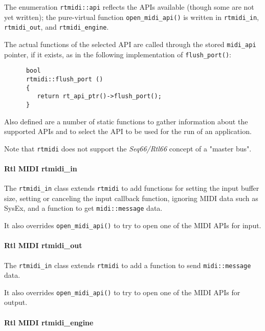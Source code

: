    The enumeration \texttt{rtmidi::api} reflects the APIs available
   (though some are not yet written); the pure-virtual function
   \texttt{open\_midi\_api()} is written in
   \texttt{rtmidi\_in}, \texttt{rtmidi\_out}, and \texttt{rtmidi\_engine}.

   The actual functions of the selected API are called through the stored
   \texttt{midi\_api} pointer, if it exists, as in the following
   implementation of \texttt{flush\_port()}:

   \begin{verbatim}
      bool
      rtmidi::flush_port ()
      {
         return rt_api_ptr()->flush_port();
      }
   \end{verbatim}

   Also defined are a number of static functions to gather information
   about the supported APIs and to select the API to be used for the
   run of an application.

   Note that \texttt{rtmidi} does not support the \textsl{Seq66/Rtl66}
   concept of a "master bus".

\paragraph{Rtl MIDI rtmidi\_in}
\label{paragraph:rtl_midi_rtmidi_in}

   The \texttt{rtmidi\_in} class extends \texttt{rtmidi} to
   add functions for setting the input buffer size, setting or canceling
   the input callback function, ignoring MIDI data such as SysEx,
   and a function to get \texttt{midi::message} data.

   It also overrides \texttt{open\_midi\_api()} to try to open
   one of the MIDI APIs for input.

\paragraph{Rtl MIDI rtmidi\_out}
\label{paragraph:rtl_midi_rtmidi_out}

   The \texttt{rtmidi\_in} class extends \texttt{rtmidi} to
   add a function to send \texttt{midi::message} data.

   It also overrides \texttt{open\_midi\_api()} to try to open
   one of the MIDI APIs for output.

\paragraph{Rtl MIDI rtmidi\_engine}
\label{paragraph:rtl_midi_rtmidi_engine}

